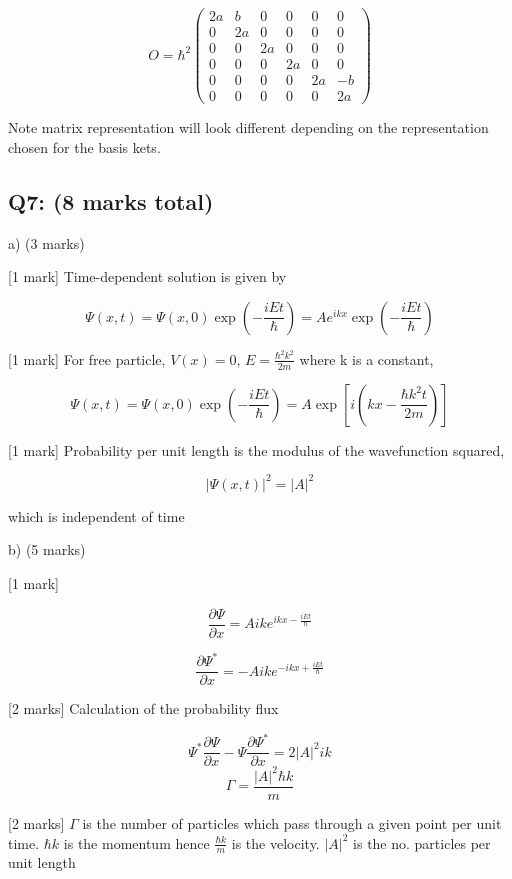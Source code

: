 \documentclass[a4paper,11pt]{article}
\begin{document}
\[ 
O = \hbar^2 \begin{pmatrix} 2a & b & 0 & 0 & 0 & 0\\ 0 & 2a & 0 & 0 & 0 & 0\\ 0 & 0 & 2a & 0 & 0 & 0\\ 0 & 0 & 0 & 2a & 0 & 0\\ 0 & 0 & 0 & 0 & 2a & -b\\ 0 & 0 & 0 & 0 & 0 & 2a \end{pmatrix}
\]

Note matrix representation will look different depending on the representation chosen for the basis kets. 

\subsection*{Q7: (8 marks total)}

a) (3 marks)

[1 mark] Time-dependent solution is given by 

\[ \Psi(x,t) = \Psi(x,0) \exp(- \frac{iEt}{\hbar}) =  Ae^{ikx} \exp(- \frac{iEt}{\hbar})  \]

[1 mark] For free particle, \( V(x) = 0 \), \( E = \frac{\hbar^2 k^2}{2m} \) where k is a constant, 

\[ \Psi(x,t) = \Psi(x,0) \exp(- \frac{iEt}{\hbar}) =  A \exp\left[ i \left( kx - \frac{\hbar k^2 t}{2m} \right) \right] \]

[1 mark] Probability per unit length is the modulus of the wavefunction squared,

\[ |\Psi(x,t)|^2 = |A|^2 \]

which is independent of time

b) (5 marks)

[1 mark] 

\[ \frac{\partial \Psi}{\partial x} = Aik e^{ikx - \frac{iEt}{\hbar}} \] 

\[ \frac{\partial \Psi^{*}}{\partial x} = -Aik e^{-ikx + \frac{iEt}{\hbar}} \] 

[2 marks] Calculation of the probability flux

\[\Psi^{*}\frac{\partial \Psi}{\partial x} - \Psi\frac{\partial \Psi^{*}}{\partial x} = 2|A|^{2}ik\]
\[\Gamma = \frac{\left|A \right|^{2}\hbar k}{m} \]  

[2 marks] \( \Gamma \) is the number of particles which pass through a given point per unit time. \( \hbar k \) is the momentum hence \( \frac{\hbar k }{m} \) is the velocity.  \( |A|^2 \) is the no. particles per unit length
\end{document}
